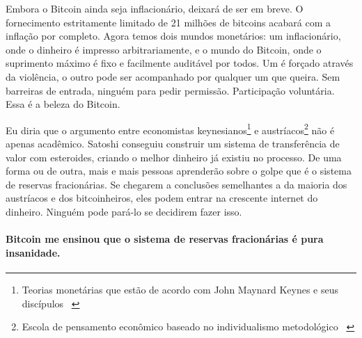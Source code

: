 Embora o Bitcoin ainda seja inflacionário, deixará de ser em breve. O fornecimento estritamente limitado de 21 milhões de bitcoins acabará com a inflação por completo. Agora temos dois mundos monetários: um inflacionário, onde o dinheiro é impresso arbitrariamente, e o mundo do Bitcoin, onde o suprimento máximo é fixo e facilmente auditável por todos. Um é forçado através da violência, o outro pode ser acompanhado por qualquer um que queira. Sem barreiras de entrada, ninguém para pedir permissão. Participação voluntária. Essa é a beleza do Bitcoin.


Eu diria que o argumento entre economistas keynesianos\footnote{Teorias monetárias que estão de acordo com John Maynard Keynes e seus discípulos ~\cite{wiki:keynesian}} e austríacos\footnote{Escola de pensamento econômico baseado no individualismo metodológico ~\cite{wiki:austrian}} não é apenas acadêmico. Satoshi conseguiu construir um sistema de transferência de valor com esteroides, criando o melhor dinheiro já existiu no processo. De uma forma ou de outra, mais e mais pessoas aprenderão sobre o golpe que é o sistema de reservas fracionárias. Se chegarem a conclusões semelhantes a da maioria dos austríacos e dos bitcoinheiros, eles podem entrar na crescente internet do dinheiro. Ninguém pode pará-lo se decidirem fazer isso.

\paragraph{Bitcoin me ensinou que o sistema de reservas fracionárias é pura insanidade.}

%
%
%
%
%
